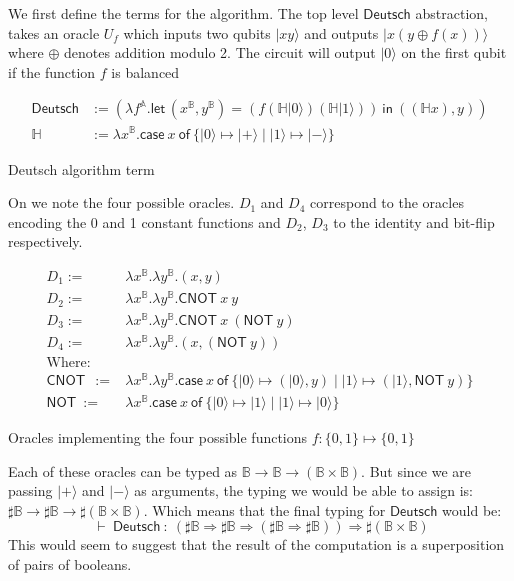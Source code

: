 \documentclass[runningheads,orivec,envcountsame,envcountsect]{llncs}
\newcommand\ket[1]{\ensuremath{|#1\rangle}}
\newcommand\AbsBasis{\ensuremath{\mathbb{A}}}
\def\Pair#1#2{(#1,#2)} %
\def\Lam#1#2#3{\lambda#1^{#2}{.}#3} %
\def\letkeyword{\mathsf{let}}
\def\inkeyword{\mathsf{in}}
\def\LetP#1#2#3#4#5#6{\letkeyword\,\Pair{#1^{#2}}{#3^{#4}}=#5~\inkeyword~#6}
\def\case#1#2#3#4#5{\ensuremath{\mathsf{case}~#1~\mathsf{of}~\{#2\mapsto #4 \mid #3\mapsto #5\}}}
\def\Arr{\Rightarrow}
\def\TYP#1#2#3{#1~{\vdash}~#2~{:}~#3}
\newcommand\B{\mathbb B}
\newcommand\Hd{\mathbb{H}}
\newcommand{\cnot}[2]{\mathsf{CNOT}\ #1\ #2}
\newcommand{\pauliX}[1]{\mathsf{NOT}\ #1}
\begin{document}
We first define the terms for the algorithm. The top level $\mathsf{Deutsch}$ abstraction, takes an oracle $U_f$  which inputs two qubits $\ket{x y}$ and outputs $\ket{x (y\oplus f(x))}$ where $\oplus$ denotes addition modulo 2. The circuit will output $\ket{0}$ on the first qubit if the function $f$ is balanced 
\begin{table}
    \small
    \begin{align*}
        \mathsf{Deutsch} &:= 
        (\Lam{{f}}{\AbsBasis}{
                \LetP{x}{\B}{y}{\B}
                {(f (\Hd \ket{0}) (\Hd \ket{1}))}
                {\Pair{(\Hd x)}{y}}
        })\\
        \Hd &:= \Lam{x}{\B}{\case{x}{\ket{0}}{\ket{1}}{\ket{+}}{\ket{-}}}
    \end{align*}
    \caption{Deutsch algorithm term}
\end{table}

On  we note the four possible oracles. $D_1$ and $D_4$ correspond to the oracles encoding the 0 and 1 constant functions and $D_2$, $D_3$ to the identity and bit-flip respectively.

\begin{table}
    \scriptsize
    \begin{align*}
        D_1 :=& \Lam{x}{\B}{\Lam{y}{\B}{\Pair{x}{y}}}\\
        D_2 :=& \Lam{x}{\B}{\Lam{y}{\B}{\cnot{x}{y}}}\\
        D_3 :=& \Lam{x}{\B}{\Lam{y}{\B}{\cnot{x}{(\pauliX{y})}}}\\
        D_4 :=& \Lam{x}{\B}{\Lam{y}{\B}{\Pair{x}{(\pauliX{y})}}}\\
        \text{Where:} &\\
        \cnot{}{} :=& \Lam{x}{\B}{\Lam{y}{\B}{
        \case{x}
        {\ket{0}}{\ket{1}}
        {\Pair{\ket{0}}{y}}{\Pair{\ket{1}}{\pauliX{y}}}}}\\
        \pauliX{} :=& \Lam{x}{\B}{\case{x}{\ket{0}}{\ket{1}}{\ket{1}}{\ket{0}}}
    \end{align*}
    
    \caption{Oracles implementing the four possible functions $f:\{0,1\}\mapsto\{0,1\}$}
    \label{tab:Oracles}
\end{table}

Each of these oracles can be typed as $\B\to\B\to(\B\times\B)$. But since we are passing $\ket{+}$ and $\ket{-}$ as arguments, the typing we would be able to assign is: $\sharp\B\to\sharp\B\to\sharp(\B\times\B)$. Which means that the final typing for $\mathsf{Deutsch}$ would be:
\[
\TYP{}{\mathsf{Deutsch}}{(\sharp\B\Arr\sharp\B\Arr(\sharp\B\Arr\sharp\B))\Arr\sharp(\B\times\B)}
\]
This would seem to suggest that the result of the computation is a superposition of pairs of booleans.
\end{document}
